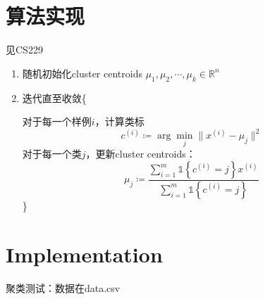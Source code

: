 \documentclass{ctexart}
\begin{document}
\section{算法实现}
见CS229\cite{stanf:cs229}
%
\begin{enumerate}[1.]
\item 随机初始化cluster centroids $\mu_1,\mu_2,\cdots,\mu_k\in\mathbb{R}^n$
\item 迭代直至收敛\{

对于每一个样例$i$，计算类标
\begin{equation}
c^{\left(i\right)}\coloneqq \arg\min\limits_{j}\big\| x^{\left(i\right)}-\mu_{j}\big\|^2
\end{equation}
对于每一个类$j$，更新cluster centroids：
\begin{equation}
\mu_j \coloneqq \frac{\sum\limits_{i=1}^{m}\mathds{1}\left\{c^{\left(i\right)}=j\right\}x^{\left(i\right)}}{\sum\limits_{i=1}^{m}\mathds{1}\left\{c^{\left(i\right)}=j\right\}}
\end{equation}
\}
\end{enumerate}

%
\section{Implementation}
聚类测试：数据在data.csv
%
%
%
%
%
\end{document}
